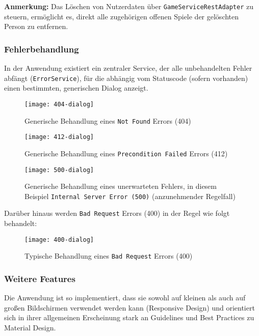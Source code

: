 \textbf{Anmerkung:} Das Löschen von Nutzerdaten über \texttt{GameServiceRestAdapter} zu steuern, ermöglicht es, direkt
alle zugehörigen offenen Spiele der gelöschten Person zu entfernen.

\subsubsection{Fehlerbehandlung}

In der Anwendung existiert ein zentraler Service, der alle unbehandelten Fehler abfängt (\texttt{ErrorService}), für die abhängig vom Statuscode (sofern vorhanden) einen
bestimmten, generischen Dialog anzeigt.

\begin{figure}[H]
    \centering
    \texttt{[image: 404-dialog]}
    \caption[]{Generische Behandlung eines \texttt{Not Found} Errors (404)}
    \label{fig:404}
\end{figure}

\begin{figure}[H]
    \centering
    \texttt{[image: 412-dialog]}
    \caption[]{Generische Behandlung eines \texttt{Precondition Failed} Errors (412)}
    \label{fig:412}
\end{figure}

\begin{figure}[H]
    \centering
    \texttt{[image: 500-dialog]}
    \caption[]{Generische Behandlung eines unerwarteten Fehlers, in diesem Beispiel \texttt{Internal Server Error (500)} (anzunehmender Regelfall)}
    \label{fig:500}
\end{figure}

Darüber hinaus werden \texttt{Bad Request} Errors (400) in der Regel wie folgt behandelt:

\begin{figure}[H]
    \centering
    \texttt{[image: 400-dialog]}
    \caption[]{Typische Behandlung eines \texttt{Bad Request} Errors (400)}
    \label{fig:400}
\end{figure}

\subsubsection{Weitere Features}

Die Anwendung ist so implementiert, dass sie sowohl auf kleinen als auch auf großen Bildschirmen verwendet werden kann (Responsive Design)
und orientiert sich in ihrer allgemeinen Erscheinung stark an Guidelines und Best Practices zu Material Design.

